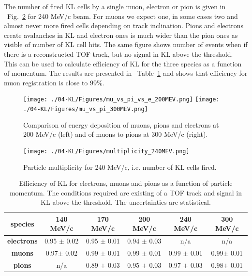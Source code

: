 The number of fired KL cells by a single muon, electron or pion is given in ~Fig.~\ref{fig:KL_mult} for 240 MeV/c beam. For muons we expect one, in some cases two and almost never more fired cells depending on track inclination. Pions and electrons create avalanches in KL and electron ones is much wider than the pion ones as visible of number of KL cell hits. The same figure shows number of events when if there is a reconstructed TOF track, but no signal in KL above the threshold. This can be used to calculate efficiency of KL for the three species as a function of momentum. The results are presented in ~Table~\ref{tab:KL_eff} and shows that efficiency for muon registration is close to 99$\%$.


 

   \begin{figure}
   	\begin{center}
   		\texttt{[image: ./04-KL/Figures/mu\_vs\_pi\_vs\_e\_200MEV.png]}  		\texttt{[image: ./04-KL/Figures/mu\_vs\_pi\_300MEV.png]}
   		\caption{Comparison of energy deposition of muons, pions and electrons at 200 MeV/c (left) and of muons to pions at 300 MeV/c (right).}
   		\label{fig:KL_mu_to_pi}
   	\end{center}
   \end{figure}
    \begin{figure}
    	\begin{center}
    		\texttt{[image: ./04-KL/Figures/multiplicity\_240MEV.png]}  		
    		\caption{Particle multiplicity for 240 MeV/c, i.e. number of KL cells fired.}
    		\label{fig:KL_mult}
    	\end{center}
    \end{figure}
       
  \begin{table}[htb]
  	\begin{center}
  		\begin{tabular}{|c|c|c|c|c|c|} 
  			\hline
  			\textbf{species} &\textbf{140 MeV/c} & \textbf{170 MeV/c} & \textbf{200 MeV/c}	&\textbf{240 MeV/c} &\textbf{300 MeV/c}\\
  			\hline
  			\textbf{electrons} & 0.95 $\pm$ 0.02  & 0.95 $\pm$ 0.01 & 0.94 $\pm$ 0.03 & n/a & n/a \\
  			\hline
  			\textbf{muons} &  0.97$\pm$ 0.02 & 0.99 $\pm$ 0.01  & 0.99 $\pm$  0.01 & 0.99 $\pm$ 0.01 & 0.99$\pm$ 0.01\\
  			\hline
  			\textbf{pions} &  n/a  & 0.89 $\pm$ 0.03  & 0.95 $\pm$ 0.03 & 0.97 $\pm$ 0.03 & 0.98$\pm$ 0.01\\
  			\hline
  		\end{tabular}
  		\caption{Efficiency of KL for electrons, muons and pions as a function of particle momentum. The conditions required are existing of a TOF track and signal in KL above the threshold. The uncertainties are statistical.}
  		\label{tab:KL_eff}
  	\end{center}
  \end{table}

